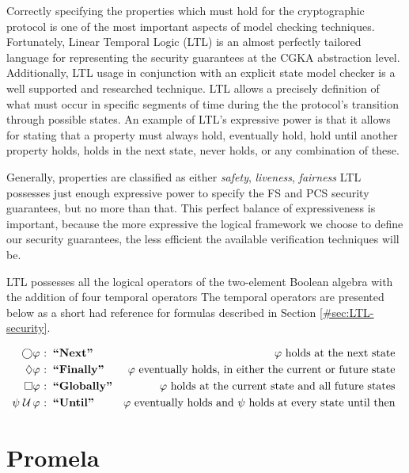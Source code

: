Correctly specifying the properties which must hold for the cryptographic protocol is one of the most important aspects of model checking techniques.
Fortunately, Linear Temporal Logic (LTL) \autocite{4567924} is an almost perfectly tailored language for representing the security guarantees at the CGKA abstraction level.
Additionally, LTL usage in conjunction with an explicit state model checker is a well supported and researched technique.
LTL allows a precisely definition of what must occur in specific segments of time during the the protocol's transition through possible states.
An example of LTL's expressive power is that it allows for stating that a property must always hold, eventually hold, hold until another property holds, holds in the next state, never holds, or any combination of these.

Generally, properties are classified as either \emph{safety}, \emph{liveness}, \emph{fairness}
LTL possesses just enough expressive power to specify the FS and PCS security guarantees, but no more than that.
This perfect balance of expressiveness is important, because the more expressive the logical framework we choose to define our security guarantees, the less efficient the available verification techniques will be.

LTL possesses all the logical operators of the two-element Boolean algebra with the addition of four temporal operators
The temporal operators are presented below as a short had reference for formulas described in Section \ref{#sec:LTL-security}.

\[
\begin{aligned}[t]
                 \bigcirc & \varphi & \!\!\!\!\textrm{:} & \;\;\textbf{``Next''}     & \varphi\textrm{ holds at the next state} \hfill~ &\\
                 \Diamond & \varphi & \!\!\!\!\textrm{:} & \;\;\textbf{``Finally''}  & \varphi\textrm{ eventually holds, in either the current or future state} \hfill~ &\\
                 \Box     & \varphi & \!\!\!\!\textrm{:} & \;\;\textbf{``Globally''} & \varphi\textrm{ holds at the current state and all future states} \hfill~ &\\
  \psi \;{\mathcal {U}}\, & \varphi & \!\!\!\!\textrm{:} & \;\;\textbf{``Until''}    & \varphi\textrm{ eventually holds and $\psi$ holds at every state until then} \hfill~ &\\
\end{aligned}
\]


\hypertarget{promela}{%
\section{Promela}\label{promela}}

